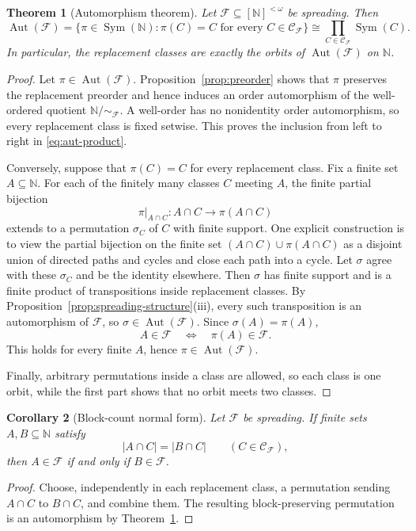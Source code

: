 \documentclass[11pt]{article}
\newtheorem{theorem}{Theorem}[section]
\newtheorem{corollary}[theorem]{Corollary}
\theoremstyle{definition}
\theoremstyle{remark}
\newcommand{\N}{\mathbb N}
\newcommand{\F}{\mathcal F}
\newcommand{\Ccal}{\mathcal C}
\newcommand{\Aut}{\operatorname{Aut}}
\newcommand{\Sym}{\operatorname{Sym}}
\begin{document}
\begin{theorem}[Automorphism theorem]\label{thm:aut}
Let $\F\subseteq[\N]^{<\omega}$ be spreading.  Then
\[
  \Aut(\F)
  =\bigl\{\pi\in\Sym(\N):\pi(C)=C
       \text{ for every }C\in\Ccal_{\F}\bigr\}
  \cong\prod_{C\in\Ccal_{\F}}\Sym(C).
  \tag{3.1}\label{eq:aut-product}
\]
In particular, the replacement classes are exactly the orbits of
$\Aut(\F)$ on $\N$.
\end{theorem}

\begin{proof}
Let $\pi\in\Aut(\F)$.  Proposition~\ref{prop:preorder} shows that $\pi$
preserves the replacement preorder and hence induces an order automorphism
of the well-ordered quotient $\N/{\sim_{\F}}$.  A well-order has no
nonidentity order automorphism, so every replacement class is fixed setwise.
This proves the inclusion from left to right in \eqref{eq:aut-product}.

Conversely, suppose that $\pi(C)=C$ for every replacement class.  Fix a finite
set $A\subseteq\N$.  For each of the finitely many classes $C$ meeting $A$,
the finite partial bijection
\[
  \pi\big|_{A\cap C}:A\cap C\longrightarrow \pi(A\cap C)
\]
extends to a permutation $\sigma_C$ of $C$ with finite support.  One explicit
construction is to view the partial bijection on the finite set
$(A\cap C)\cup\pi(A\cap C)$ as a disjoint union of directed paths and cycles
and close each path into a cycle.  Let $\sigma$ agree with these $\sigma_C$
and be the identity elsewhere.  Then $\sigma$ has finite support and is a
finite product of transpositions inside replacement classes.  By
Proposition~\ref{prop:spreading-structure}(iii), every such transposition is
an automorphism of $\F$, so $\sigma\in\Aut(\F)$.  Since
$\sigma(A)=\pi(A)$,
\[
  A\in\F\quad\Longleftrightarrow\quad\pi(A)\in\F.
\]
This holds for every finite $A$, hence $\pi\in\Aut(\F)$.

Finally, arbitrary permutations inside a class are allowed, so each class is
one orbit, while the first part shows that no orbit meets two classes.
\end{proof}

\begin{corollary}[Block-count normal form]\label{cor:block-count}
Let $\F$ be spreading.  If finite sets $A,B\subseteq\N$ satisfy
\[
  |A\cap C|=|B\cap C|\qquad(C\in\Ccal_{\F}),
\]
then $A\in\F$ if and only if $B\in\F$.
\end{corollary}

\begin{proof}
Choose, independently in each replacement class, a permutation sending
$A\cap C$ to $B\cap C$, and combine them.  The resulting block-preserving
permutation is an automorphism by Theorem~\ref{thm:aut}.
\end{proof}
\end{document}
